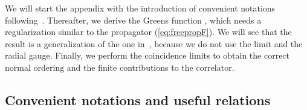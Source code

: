 \documentclass[a4paper,12pt]{article}
\let\bra=\langle        \let\ket=\rangle
\begin{document}
We will start the appendix with the introduction of convenient
notations following~\cite{Cornalba:2001sm}. Thereafter, we derive the
Greens function
\myHighlight{$\bra\zeta^\mu(\tau_i) \zeta^\nu(\tau_j) \zeta^\rho(\tau_k)\ket$}\coordHE{}, which
needs a regularization similar to the propagator
(\ref{eq:freepropF}). We will see that the result is a generalization
of the one in~\cite{Cornalba:2001sm}, because we do not use the
limit \coordHE{} and the radial gauge.
Finally, we perform the coincidence limits
to obtain the correct normal ordering and the finite contributions to
the correlator.


\subsection{Convenient notations and useful relations}
\end{document}
